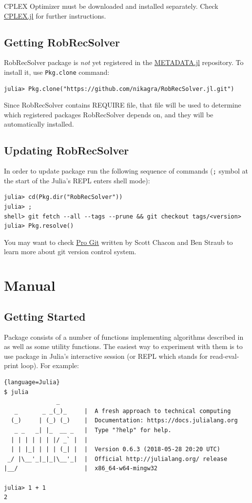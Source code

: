 CPLEX Optimizer must be downloaded and installed separately. Check \href{https://github.com/JuliaOpt/CPLEX.jl}{CPLEX.jl} for further instructions.

\subsection{Getting RobRecSolver}
RobRecSolver package is \textit{not} yet registered in the \href{https://github.com/JuliaLang/METADATA.jl}{METADATA.jl} repository. To install it, use \texttt{Pkg.clone} command:
\begin{lstlisting}
julia> Pkg.clone("https://github.com/nikagra/RobRecSolver.jl.git")
\end{lstlisting}

Since RobRecSolver contains REQUIRE file, that file will be used to determine which
registered packages RobRecSolver depends on, and they will be automatically installed.

\subsection{Updating RobRecSolver}
In order to update package run the following sequence of commands (\texttt{;} symbol
at the start of the Julia's REPL enters shell mode):
\begin{lstlisting}
julia> cd(Pkg.dir("RobRecSolver"))
julia> ;
shell> git fetch --all --tags --prune && git checkout tags/<version>
julia> Pkg.resolve()
\end{lstlisting}
You may want to check \href{https://git-scm.com/book/en/v2}{Pro Git} written by Scott Chacon and Ben Straub to learn more about git version control system.

\section{Manual}

\subsection{Getting Started}
Package consists of a number of functions implementing algorithms described in \cite{HKZ19} as well as some utility functions. The easiest way to experiment with them is to use package in Julia's interactive session (or REPL which stands for read-eval-print loop). For example:
\begin{lstlisting}{language=Julia}
$ julia
               _
   _       _ _(_)_     |  A fresh approach to technical computing
  (_)     | (_) (_)    |  Documentation: https://docs.julialang.org
   _ _   _| |_  __ _   |  Type "?help" for help.
  | | | | | | |/ _` |  |
  | | |_| | | | (_| |  |  Version 0.6.3 (2018-05-28 20:20 UTC)
 _/ |\__'_|_|_|\__'_|  |  Official http://julialang.org/ release
|__/                   |  x86_64-w64-mingw32

julia> 1 + 1
2
\end{lstlisting}

